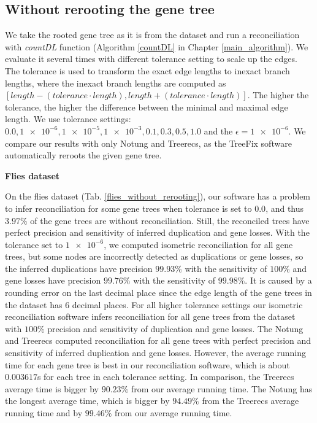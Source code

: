 \subsection{Without rerooting the gene tree} \label{without_rerooting_the_gene_tree}

We take the rooted gene tree as it is from the dataset and run a reconciliation with \emph{countDL} function (Algorithm \ref{countDL} in Chapter \ref{main_algorithm}). We evaluate it several times with different tolerance setting to scale up the edges. The tolerance is used to transform the exact edge lengths to inexact branch lengths, where the inexact branch lengths are computed as $[ length - (tolerance \cdot length), length + (tolerance \cdot length)]$. The higher the tolerance, the higher the difference between the minimal and maximal edge length. We use tolerance settings: $0.0, \num{1e-6}, \num{1e-5}, \num{1e-3}, 0.1, 0.3, 0.5, 1.0$ and the $\epsilon = \num{1e-6}$. We compare our results with only Notung and Treerecs, as the TreeFix software automatically reroots the given gene tree.

\noindent\textbf{Flies dataset}

On the flies dataset (Tab. \ref{flies_without_rerooting}), our software has a problem to infer reconciliation for some gene trees when tolerance is set to $0.0$, and thus $3.97\%$ of the gene trees are without reconciliation. Still, the reconciled trees have perfect precision and sensitivity of inferred duplication and gene losses. With the tolerance set to $\num{1e-6}$, we computed isometric reconciliation for all gene trees, but some nodes are incorrectly detected as duplications or gene losses, so the inferred duplications have precision $99.93\%$ with the sensitivity of $100\%$ and gene losses have precision $99.76\%$ with the sensitivity of $99.98\%$. It is caused by a rounding error on the last decimal place since the edge length of the gene trees in the dataset has 6 decimal places. For all higher tolerance settings our isometric reconciliation software infers reconciliation for all gene trees from the dataset with $100\%$ precision and sensitivity of duplication and gene losses. The Notung and Treerecs computed reconciliation for all gene trees with perfect precision and sensitivity of inferred duplication and gene losses. However, the average running time for each gene tree is best in our reconciliation software, which is about $0.003617$s for each tree in each tolerance setting. In comparison, the Treerecs average time is bigger by $90.23\%$ from our average running time. The Notung has the longest average time, which is bigger by $94.49\%$ from the Treerecs average running time and by $99.46\%$ from our average running time.

